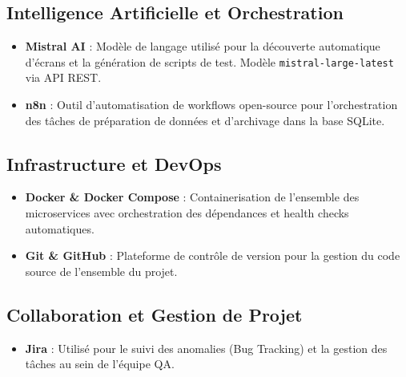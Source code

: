\subsection{Intelligence Artificielle et Orchestration}
\begin{itemize}[leftmargin=*]
\item \textbf{Mistral AI} : Modèle de langage utilisé pour la découverte automatique d'écrans et la génération de scripts de test. Modèle \texttt{mistral-large-latest} via API REST.
\item \textbf{n8n} : Outil d'automatisation de workflows open-source pour l'orchestration des tâches de préparation de données et d'archivage dans la base SQLite.
\end{itemize}

\subsection{Infrastructure et DevOps}
\begin{itemize}[leftmargin=*]
\item \textbf{Docker \& Docker Compose} : Containerisation de l'ensemble des microservices avec orchestration des dépendances et health checks automatiques.
\item \textbf{Git \& GitHub} : Plateforme de contrôle de version pour la gestion du code source de l'ensemble du projet.
\end{itemize}

\subsection{Collaboration et Gestion de Projet}
\begin{itemize}[leftmargin=*]
\item \textbf{Jira} : Utilisé pour le suivi des anomalies (Bug Tracking) et la gestion des tâches au sein de l'équipe QA.
\end{itemize}

